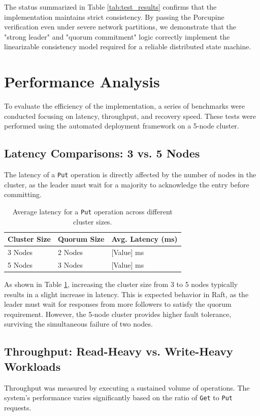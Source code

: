 The status summarized in Table \ref{tab:test_results} confirms that the implementation maintains strict consistency. By passing the Porcupine verification even under severe network partitions, we demonstrate that the "strong leader" and "quorum commitment" logic correctly implement the linearizable consistency model required for a reliable distributed state machine.

\section{Performance Analysis}
\label{sec:performance_analysis}
To evaluate the efficiency of the implementation, a series of benchmarks were conducted focusing on latency, throughput, and recovery speed. These tests were performed using the automated deployment framework on a 5-node cluster.

\subsection{Latency Comparisons: 3 vs. 5 Nodes}
The latency of a \texttt{Put} operation is directly affected by the number of nodes in the cluster, as the leader must wait for a majority to acknowledge the entry before committing. 

\begin{table}[h]
\centering
\caption{Average latency for a \texttt{Put} operation across different cluster sizes.}
\label{tab:latency_comparison}
\begin{tabular}{|l|l|l|}
\hline
\textbf{Cluster Size} & \textbf{Quorum Size} & \textbf{Avg. Latency (ms)} \\ \hline
3 Nodes & 2 Nodes & [Value] ms \\ \hline
5 Nodes & 3 Nodes & [Value] ms \\ \hline
\end{tabular}
\end{table}

As shown in Table \ref{tab:latency_comparison}, increasing the cluster size from 3 to 5 nodes typically results in a slight increase in latency. This is expected behavior in Raft, as the leader must wait for responses from more followers to satisfy the quorum requirement. However, the 5-node cluster provides higher fault tolerance, surviving the simultaneous failure of two nodes.



\subsection{Throughput: Read-Heavy vs. Write-Heavy Workloads}
Throughput was measured by executing a sustained volume of operations. The system's performance varies significantly based on the ratio of \texttt{Get} to \texttt{Put} requests.

